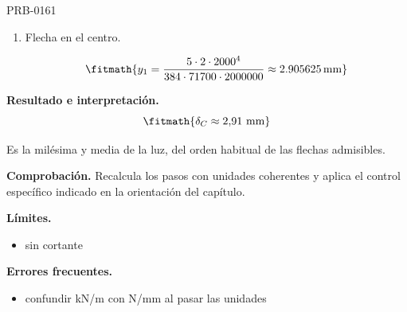 \begin{studiumworked}{PRB-0161}
\begin{enumerate}
\item Flecha en el centro.

\[\fitmath{y_{1}=\frac{5\cdot 2\cdot {2000}^{4}}{384\cdot 71700\cdot 2000000}\approx 2.905625\,\mathrm{mm}}\]

\end{enumerate}

\textbf{Resultado e interpretación.}\[\fitmath{\delta_C \approx 2{,}91\ \mathrm{mm}}\]

Es la milésima y media de la luz, del orden habitual de las flechas admisibles.

\par\textbf{Comprobación.} Recalcula los pasos con unidades coherentes y aplica el control específico indicado en la orientación del capítulo.

\textbf{Límites.}\begin{itemize}\item sin cortante\end{itemize}

\textbf{Errores frecuentes.}\begin{itemize}\item confundir kN/m con N/mm al pasar las unidades\end{itemize}

\end{studiumworked}

\Needspace{.3\textheight}

